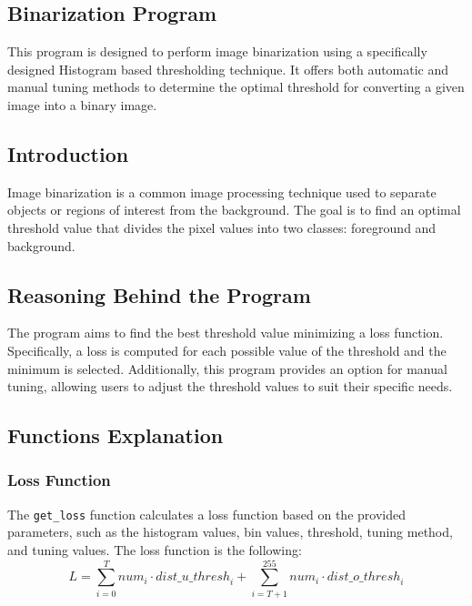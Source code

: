 \begin{multicols}{2}

\section{Binarization Program}

This program is designed to perform image binarization using a specifically designed Histogram based thresholding technique.
It offers both automatic and manual tuning methods to determine the optimal threshold for converting a given image into a binary image.

\subsection{Introduction}

Image binarization is a common image processing technique used to separate objects or regions of interest from the background.
The goal is to find an optimal threshold value that divides the pixel values into two classes: foreground and background.

\subsection{Reasoning Behind the Program}

The program aims to find the best threshold value minimizing a loss function. Specifically, a loss is computed for each possible value of the threshold and the minimum is selected. Additionally, this program provides an option for manual tuning, allowing users to adjust the threshold values to suit their specific needs.

\subsection{Functions Explanation}

\subsubsection{Loss Function}

The \texttt{get\_loss} function calculates a loss function based on the provided parameters, such as the histogram values, bin values, threshold, tuning method, and tuning values. The loss function is the following:
$$
    L = \sum_{i=0}^{T} {{num}}_{i} \cdot {{dist\_u\_thresh}}_{i} + \sum_{i=T+1}^{255} {{num}}_{i} \cdot {{dist\_o\_thresh}}_{i}
$$


\end{multicols}
